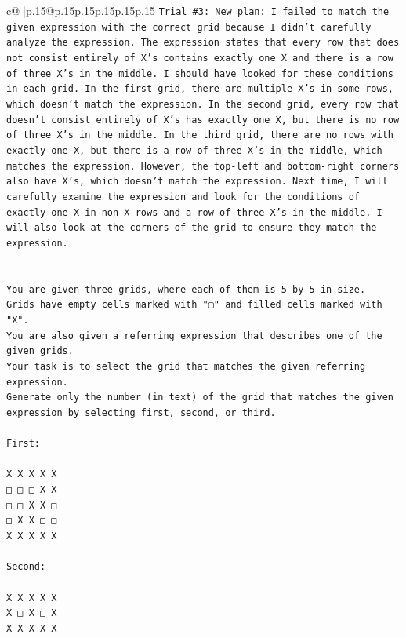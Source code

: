\documentclass{article}
\begin{document}
{\begin{supertabular}{c@{$\;$}|p{.15\linewidth}@{}p{.15\linewidth}p{.15\linewidth}p{.15\linewidth}p{.15\linewidth}p{.15\linewidth}}
{{{\texttt{Trial \#3: New plan: I failed to match the given expression with the correct grid because I didn't carefully analyze the expression. The expression states that every row that does not consist entirely of X's contains exactly one X and there is a row of three X's in the middle. I should have looked for these conditions in each grid. In the first grid, there are multiple X's in some rows, which doesn't match the expression. In the second grid, every row that doesn't consist entirely of X's has exactly one X, but there is no row of three X's in the middle. In the third grid, there are no rows with exactly one X, but there is a row of three X's in the middle, which matches the expression. However, the top{-}left and bottom{-}right corners also have X's, which doesn't match the expression. Next time, I will carefully examine the expression and look for the conditions of exactly one X in non{-}X rows and a row of three X's in the middle. I will also look at the corners of the grid to ensure they match the expression.} \\
\\ 
\\ 
\texttt{You are given three grids, where each of them is 5 by 5 in size.} \\
\texttt{Grids have empty cells marked with "▢" and filled cells marked with "X".} \\
\texttt{You are also given a referring expression that describes one of the given grids.} \\
\texttt{Your task is to select the grid that matches the given referring expression.} \\
\texttt{Generate only the number (in text) of the grid that matches the given expression by selecting first, second, or third.} \\
\\ 
\texttt{First:} \\
\\ 
\texttt{X X X X X} \\
\texttt{□ □ □ X X} \\
\texttt{□ □ X X □} \\
\texttt{□ X X □ □} \\
\texttt{X X X X X} \\
\\ 
\texttt{Second:} \\
\\ 
\texttt{X X X X X} \\
\texttt{X □ X □ X} \\
\texttt{X X X X X} \\
}}}
\end{supertabular}}
\end{document}
